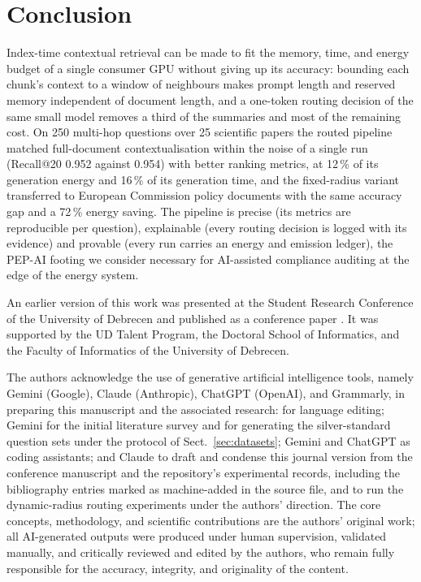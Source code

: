 \documentclass[pdflatex,sn-mathphys-num]{sn-jnl}
\makeatletter
\newcommand{\Rec}[1]{Recall@#1}
\theoremstyle{thmstyleone}%
\theoremstyle{thmstylethree}%
\makeatother
\begin{document}
\section{Conclusion}\label{sec:conclusion}

Index-time contextual retrieval can be made to fit the memory, time, and energy budget of a single consumer GPU without giving up its accuracy: bounding each chunk's context to a window of neighbours makes prompt length and reserved memory independent of document length, and a one-token routing decision of the same small model removes a third of the summaries and most of the remaining cost. On 250 multi-hop questions over 25 scientific papers the routed pipeline matched full-document contextualisation within the noise of a single run (\Rec{20} 0.952 against 0.954) with better ranking metrics, at 12\,\% of its generation energy and 16\,\% of its generation time, and the fixed-radius variant transferred to European Commission policy documents with the same accuracy gap and a 72\,\% energy saving. The pipeline is precise (its metrics are reproducible per question), explainable (every routing decision is logged with its evidence) and provable (every run carries an energy and emission ledger), the PEP-AI footing we consider necessary for AI-assisted compliance auditing at the edge of the energy system.

\backmatter

An earlier version of this work was presented at the Student Research Conference of the University of Debrecen and published as a conference paper \cite{sandor2025documentslicecontextualretrieval}. It was supported by the UD Talent Program, the Doctoral School of Informatics, and the Faculty of Informatics of the University of Debrecen.

The authors acknowledge the use of generative artificial intelligence tools, namely Gemini (Google), Claude (Anthropic), ChatGPT (OpenAI), and Grammarly, in preparing this manuscript and the associated research: for language editing; Gemini for the initial literature survey and for generating the silver-standard question sets under the protocol of Sect.~\ref{sec:datasets}; Gemini and ChatGPT as coding assistants; and Claude to draft and condense this journal version from the conference manuscript and the repository's experimental records, including the bibliography entries marked as machine-added in the source file, and to run the dynamic-radius routing experiments under the authors' direction. The core concepts, methodology, and scientific contributions are the authors' original work; all AI-generated outputs were produced under human supervision, validated manually, and critically reviewed and edited by the authors, who remain fully responsible for the accuracy, integrity, and originality of the content.
\end{document}
